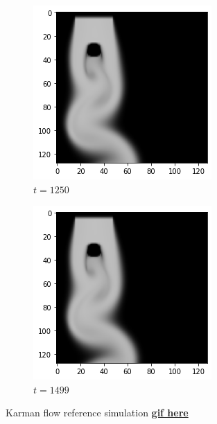 \documentclass[a4paper,12pt,twoside]{report}
\begin{document}
\begin{figure}
\begin{subfigure}{0.18\textwidth}
	\end{subfigure}
	\begin{subfigure}{0.18\textwidth}
		\centering
		\includegraphics[scale=0.3]{timecost/ref1250.png}
		\caption{$t=1250$}
	\end{subfigure}
	\begin{subfigure}{0.18\textwidth}
		\centering
		\includegraphics[scale=0.3]{timecost/ref1499.png}
		\caption{$t=1499$}
	\end{subfigure}
	\caption{Karman flow reference simulation \href{https://github.com/w191444052/sol-data/blob/master/sol\%2Bsuperresolution/ref.gif}{\textbf{gif here}}}
	\label{timecost ref}
\end{figure}
\end{document}
